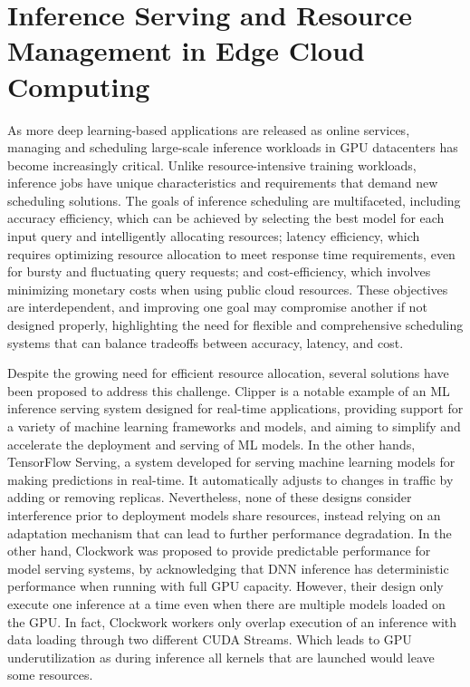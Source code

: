 \section{Inference Serving and Resource Management in Edge Cloud Computing}

As more deep learning-based applications are released as online services, managing and scheduling large-scale inference workloads in GPU datacenters has become increasingly critical. Unlike resource-intensive training workloads, inference jobs have unique characteristics and requirements that demand new scheduling solutions. The goals of inference scheduling are multifaceted, including accuracy efficiency, which can be achieved by selecting the best model for each input query and intelligently allocating resources; latency efficiency, which requires optimizing resource allocation to meet response time requirements, even for bursty and fluctuating query requests; and cost-efficiency, which involves minimizing monetary costs when using public cloud resources. These objectives are interdependent, and improving one goal may compromise another if not designed properly, highlighting the need for flexible and comprehensive scheduling systems that can balance tradeoffs between accuracy, latency, and cost.

Despite the growing need for efficient resource allocation, several solutions have been proposed to address this challenge. Clipper is a notable example of an ML inference serving system designed for real-time applications, providing support for a variety of machine learning frameworks and models, and aiming to simplify and accelerate the deployment and serving of ML models. In the other hands, TensorFlow Serving, a system developed for serving machine learning models for making predictions in real-time. It automatically adjusts to changes in traffic by adding or removing replicas. Nevertheless, none of these designs consider interference prior to deployment models share resources, instead relying on an adaptation mechanism that can lead to further performance degradation. In the other hand, Clockwork was proposed to provide predictable performance for model serving systems, by acknowledging that DNN inference has deterministic performance when running with full GPU capacity. However, their design only execute one inference at a time even when there are multiple models loaded on the GPU. In fact, Clockwork workers only overlap execution of an inference with data loading through two different CUDA Streams. Which leads to GPU underutilization as during inference all kernels that are launched would leave some resources.


